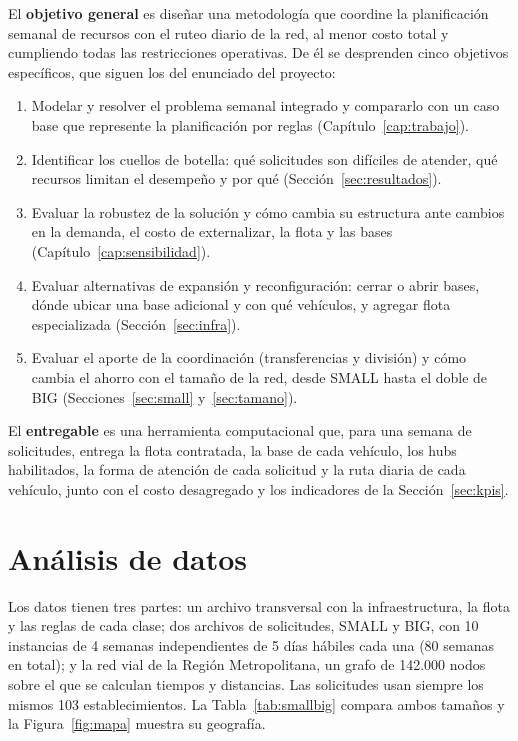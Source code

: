 El \textbf{objetivo general} es diseñar una metodología que coordine la planificación semanal de recursos con el ruteo diario de la red, al menor costo total y cumpliendo todas las restricciones operativas. De él se desprenden cinco objetivos específicos, que siguen los del enunciado del proyecto:
\begin{enumerate}\itemsep0pt
\item[O1.] Modelar y resolver el problema semanal integrado y compararlo con un caso base que represente la planificación por reglas (Capítulo~\ref{cap:trabajo}).
\item[O2.] Identificar los cuellos de botella: qué solicitudes son difíciles de atender, qué recursos limitan el desempeño y por qué (Sección~\ref{sec:resultados}).
\item[O3.] Evaluar la robustez de la solución y cómo cambia su estructura ante cambios en la demanda, el costo de externalizar, la flota y las bases (Capítulo~\ref{cap:sensibilidad}).
\item[O4.] Evaluar alternativas de expansión y reconfiguración: cerrar o abrir bases, dónde ubicar una base adicional y con qué vehículos, y agregar flota especializada (Sección~\ref{sec:infra}).
\item[O5.] Evaluar el aporte de la coordinación (transferencias y división) y cómo cambia el ahorro con el tamaño de la red, desde SMALL hasta el doble de BIG (Secciones~\ref{sec:small} y~\ref{sec:tamano}).
\end{enumerate}
El \textbf{entregable} es una herramienta computacional que, para una semana de solicitudes, entrega la flota contratada, la base de cada vehículo, los hubs habilitados, la forma de atención de cada solicitud y la ruta diaria de cada vehículo, junto con el costo desagregado y los indicadores de la Sección~\ref{sec:kpis}.

\section{Análisis de datos}\label{sec:datos}

Los datos tienen tres partes: un archivo transversal con la infraestructura, la flota y las reglas de cada clase; dos archivos de solicitudes, SMALL y BIG, con 10 instancias de 4 semanas independientes de 5 días hábiles cada una (80 semanas en total); y la red vial de la Región Metropolitana, un grafo de 142.000 nodos sobre el que se calculan tiempos y distancias. Las solicitudes usan siempre los mismos 103 establecimientos. La Tabla~\ref{tab:smallbig} compara ambos tamaños y la Figura~\ref{fig:mapa} muestra su geografía.

